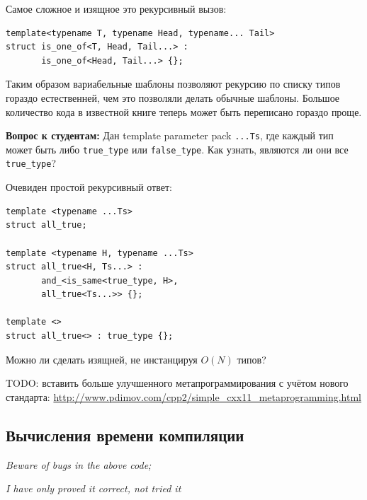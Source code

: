 \documentclass[a4paper,12pt,oneside]{article}
\newif\ifanswers
\begin{document}
Самое сложное и изящное это рекурсивный вызов:

\begin{lstlisting}
template<typename T, typename Head, typename... Tail>
struct is_one_of<T, Head, Tail...> : 
       is_one_of<Head, Tail...> {};
\end{lstlisting}

Таким образом вариабельные шаблоны позволяют рекурсию по списку типов гораздо естественней, чем это позволяли делать обычные шаблоны. Большое количество кода в известной книге \cite{mcpp} теперь может быть переписано гораздо проще.

\textbf{Вопрос к студентам:} Дан template parameter pack \lstinline!...Ts!, где каждый тип может быть либо \lstinline!true_type! или \lstinline!false_type!. Как узнать, являются ли они все \lstinline!true_type!?

Очевиден простой рекурсивный ответ:

\begin{lstlisting}
template <typename ...Ts>
struct all_true;

template <typename H, typename ...Ts>
struct all_true<H, Ts...> : 
       and_<is_same<true_type, H>, 
       all_true<Ts...>> {};

template <>
struct all_true<> : true_type {};
\end{lstlisting}

Можно ли сделать изящней, не инстанцируя $O(N)$ типов?

\ifanswers
Более просветляющий ответ использует кортежи:

\begin{lstlisting}
template <typename H, typename ...Ts>
struct all_true<H, Ts...> : 
       and_<is_same<true_type, H>, 
       is_same<tuple<H,Ts...>,
               tuple<Ts...,H>>> {};
\end{lstlisting}
\fi

TODO: вставить больше улучшенного метапрограммирования с учётом нового стандарта:
\url{http://www.pdimov.com/cpp2/simple_cxx11_metaprogramming.html}

\pagebreak
\subsection{Вычисления времени компиляции}

\hfill\textit{Beware of bugs in the above code;}

\hfill\textit{I have only proved it correct, not tried it}{\vspace{0.5em}}
\end{document}

